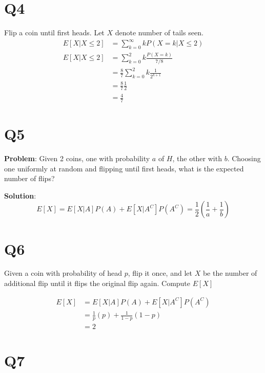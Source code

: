  \section{Q4}

 Flip a coin until first heads. Let $X$ denote number of tails seen. \\

\begin{align*}
   E\left[ X | X \leq 2\right]  &= \sum_{k = 0}^{\infty} k P(X = k | X \leq 2) \\
   E\left[ X | X \leq 2\right]  &= \sum_{k = 0}^{2} k \frac{P(X = k)}{ 7 / 8 } \\ 
                                &= \frac{8}{7} \sum_{k = 0}^{2}  k \frac{1}{2^{k + 1}} \\
                                &= \frac{8}{7} \frac{1}{2 } \\
                                &= \frac{4}{7}
\end{align*}

\section{Q5} 

\textbf{Problem}: Given 2 coins, one with probability $a$ of $H$, the other with $b$. Choosing one uniformly at random and flipping until first heads, what is the expected number of flips?

\textbf{Solution}: 
\[
  E\left[ X \right]  = E\left[ X | A\right]  P(A) + E\left[ X | A^C\right] P(A^C) = \frac{1}{2} \left( \frac{1}{a} + \frac{1}{b} \right) 
\]

\section{Q6}

Given a coin with probability of head $p$, flip it once, and let $X$ be the number of additional flip until it flips the original flip again. Compute  $E\left[ X\right] $

\begin{align*}
   E\left[ X\right]  &= E\left[ X | A\right] P(A) + E\left[ X | A^C\right]  P(A^C) \\
                     &= \frac{1}{p} (p) + \frac{1 }{1 - p} ( 1- p) \\
                     &= 2
\end{align*}

\section{Q7}

